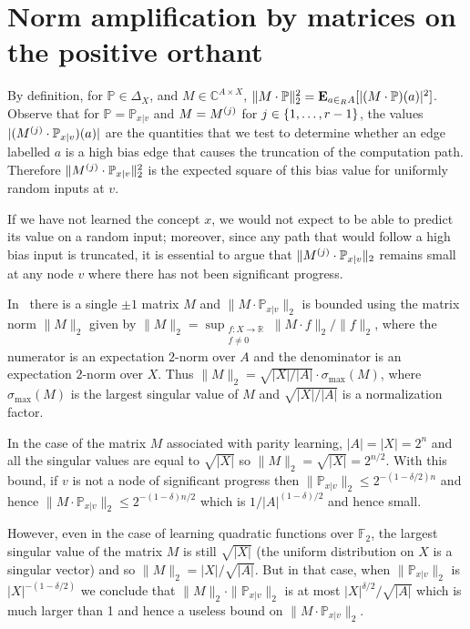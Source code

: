 \newpage
\section{Norm amplification by matrices on the positive orthant}

By definition, for $\mathbb{P}\in \Delta_X$, and $M\in \mathbb{C}^{A\times X}$,
$\|M\cdot \mathbb{P}\|_2^2= {\mathbf E}_{a\in_R A} [|(M\cdot \mathbb{P})(a)|^2]$.
Observe that for $\mathbb{P}=\mathbb{P}_{x|v}$ and $M=M^{(j)}$ for
$j\in \{1,\ldots,r-1\}$, the values
$|(M^{(j)}\cdot \mathbb{P}_{x|v})(a)|$ are the quantities that we test to determine
whether an edge labelled $a$ is a high bias edge that causes the truncation
of the computation path.  Therefore $\|M^{(j)}\cdot \mathbb{P}_{x|v}\|_2^2$ is
the expected square of this bias value for uniformly random inputs at $v$.

If we have not learned the concept $x$, we would not expect to be able to predict
its value on a random input; moreover, since any path that 
would follow a high bias input is truncated, it is essential to argue
that $\|M^{(j)}\cdot \mathbb{P}_{x|v}\|_2$ remains small at any node $v$ where there
has not been significant progress.

In~\cite{DBLP:conf/focs/Raz17} there is a single $\pm 1$ matrix $M$ and
$\|M\cdot \mathbb{P}_{x|v}\|_2$ is
bounded using the matrix norm $\|M\|_2$ given by
$\|M\|_2=\sup_{\substack{f:X\rightarrow \mathbb{R}\\f\ne 0}}\|M\cdot f\|_2/\|f\|_2$,
where the numerator is an expectation $2$-norm over $A$ and the denominator
is an expectation $2$-norm over $X$.
Thus $\|M\|_2=\sqrt{|X|/|A|}\cdot \sigma_{\max}(M)$,
where $\sigma_{\max}(M)$ is the largest singular value of $M$ and $\sqrt{|X|/|A|}$ is a normalization factor.

In the case of the matrix $M$ associated with parity learning, $|A|=|X|=2^n$
and
all the singular values are equal to $\sqrt{|X|}$ so
$\|M\|_2=\sqrt{|X|}=2^{n/2}$.  With this bound, if $v$ is not a node of
significant progress then $\|\mathbb{P}_{x|v}\|_2\le 2^{-(1-\delta/2) n}$
and hence $\|M\cdot \mathbb{P}_{x|v}\|_2 \le 2^{-(1-\delta) n/2}$ which is
$1/|A|^{(1-\delta)/2}$ and hence small.

However, even in the case of learning quadratic functions over $\mathbb{F}_2$,
the largest singular value of the matrix $M$ is still $\sqrt{|X|}$  (the uniform
distribution on $X$ is a singular vector) and so $\|M\|_2=|X|/\sqrt{|A|}$. 
But in that case, when $\|\mathbb{P}_{x|v}\|_2$ is $|X|^{-(1-\delta/2)}$ we
conclude that $\|M\|_2 \cdot\|\mathbb{P}_{x|v}\|_2$ is at most
$|X|^{\delta/2}/\sqrt{|A|}$ which is
much larger than 1 and hence a useless bound on $\|M\cdot \mathbb{P}_{x|v}\|_2$.

